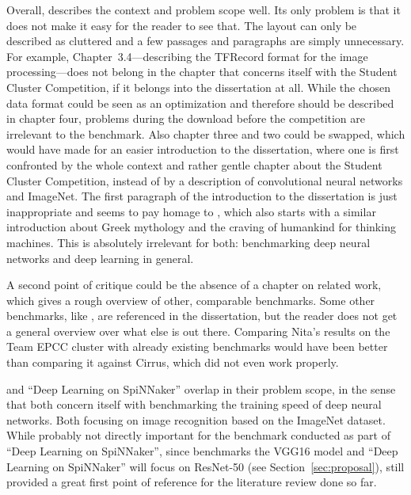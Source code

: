 \documentclass{article}
\begin{document}
Overall, \citet{nita_2018} describes the context and
problem scope well.
Its only problem is that it does not make it easy for the
reader to see that.
The layout can only be described as cluttered and a few
passages and paragraphs are simply unnecessary.
For example, Chapter~3.4---describing the TFRecord format for the
image processing---does not belong in the chapter
that concerns itself with the Student Cluster Competition,
if it belongs into the dissertation at all.
While the chosen data format could be seen as an
optimization and therefore should be described in chapter
four, problems during the download before the competition
are irrelevant to the benchmark.
Also chapter three and two could be swapped, which would
have made for an easier introduction to the dissertation,
where one is first confronted by the whole context and
rather gentle chapter about the Student Cluster
Competition, instead of by a description of convolutional
neural networks and ImageNet.
The first paragraph of the introduction to the dissertation
is just inappropriate and seems to pay homage to
\citet{goodfellow2016}, which also starts with a similar introduction
about Greek mythology and the craving of humankind for thinking
machines.
This is absolutely irrelevant for both: benchmarking deep neural
networks and deep learning in general.

A second point of critique could be the absence of a
chapter on related work, which gives a rough overview of
other, comparable benchmarks.
Some other benchmarks, like \citet{you2017}, are referenced
in the dissertation, but the reader does not get a general
overview over what else is out there.
Comparing Nita's results on the Team EPCC cluster with already
existing benchmarks would have been better than comparing it against
Cirrus, which did not even work properly.

\citet{nita_2018} and ``Deep Learning on SpiNNaker''
overlap in their problem scope, in the sense that both
concern itself with benchmarking the training speed of
deep neural networks.
Both focusing on image recognition based on the ImageNet
dataset.
While probably not directly important for the benchmark
conducted as part of ``Deep Learning on SpiNNaker'',
since \citet{nita_2018} benchmarks the VGG16 model and
``Deep Learning on SpiNNaker'' will focus on ResNet-50
(see Section~\ref{sec:proposal}),
\citet{nita_2018} still provided a great first point of
reference for the literature review done so far.



\end{document}
